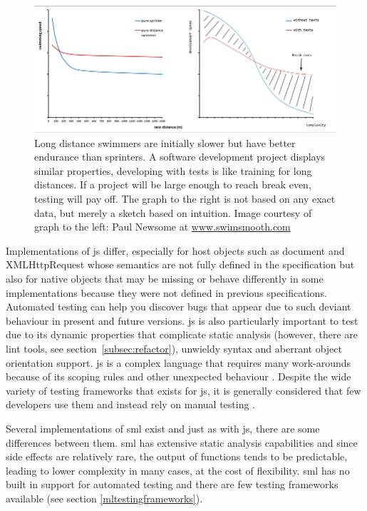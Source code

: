 \documentclass[11pt]{article}
\begin{document}
\begin{figure}[ht]
\centering
\includegraphics[width=\textwidth]{pics/distance.png}
\caption{Long distance swimmers are initially slower but have better endurance than sprinters.
A software development project displays similar properties, developing with tests is like training for long distances.
If a project will be large enough to reach break even, testing will pay off.
The graph to the right is not based on any exact data, but merely a sketch based on intuition.
Image courtesy of graph to the left: Paul Newsome at \small \url{www.swimsmooth.com}}
\label{fig:distance}
\end{figure}

Implementations of \gls{js} differ, especially for host objects such as document and XMLHttpRequest whose semantics are not fully defined in the specification but also for native objects that may be missing or behave differently in some implementations because they were not defined in previous specifications. Automated testing can help you discover bugs that appear due to such deviant behaviour in present and future versions. \gls{js} is also particularly important to test due to its dynamic properties \cite{AutomatedTesting} that complicate static analysis (however, there are lint tools, see section~\ref{subsec:refactor}), unwieldy syntax and aberrant object orientation support. \gls{js} is a complex language that requires many work-arounds because of its scoping rules and other unexpected behaviour \cite[appendix A]{GoodParts}. Despite the wide variety of testing frameworks that exists for \gls{js}, it is generally considered that few developers use them and instead rely on manual testing \cite{AutomatedTesting}.

Several implementations of \gls{sml} exist and just as with \gls{js}, there are some differences between them. \gls{sml} has extensive static analysis capabilities and since side effects are relatively rare, the output of functions tends to be predictable, leading to lower complexity in many cases, at the cost of flexibility. \gls{sml} has no built in support for automated testing and there are few testing frameworks available (see section \ref{mltestingframeworks}).
\end{document}
